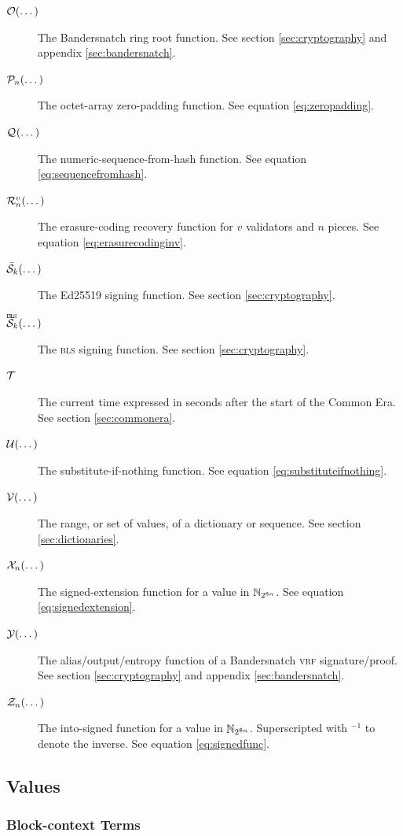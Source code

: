 \begin{description}
  \item[$\getringroot{\dots}$] The Bandersnatch ring root function. See section \ref{sec:cryptography} and appendix \ref{sec:bandersnatch}.
  \item[$\zeropad{n}{\dots}$] The octet-array zero-padding function. See equation \ref{eq:zeropadding}.
  \item[$\seqfromhash{}{\dots}$] The numeric-sequence-from-hash function. See equation \ref{eq:sequencefromhash}.
  \item[$\ecrecover{v}{n}{\dots}$] The erasure-coding recovery function for $v$ validators and $n$ pieces. See equation \ref{eq:erasurecodinginv}.
  \item[$\edsigndata{k}{\dots}$] The Ed25519 signing function. See section \ref{sec:cryptography}.
  \item[$\blssigndata{k}{\dots}$] The \textsc{bls} signing function. See section \ref{sec:cryptography}.
  \item[$\mathcal{T}$] The current time expressed in seconds after the start of the \Jam Common Era. See section \ref{sec:commonera}.
  \item[$\subifnone{\dots}$] The substitute-if-nothing function. See equation \ref{eq:substituteifnothing}.
  \item[$\values{\dots}$] The range, or set of values, of a dictionary or sequence. See section \ref{sec:dictionaries}.
  \item[$\sext{n}{\dots}$] The signed-extension function for a value in $\mathbb{N}_{2^{8n}}$. See equation \ref{eq:signedextension}.
  \item[$\banderout{\dots}$] The alias/output/entropy function of a Bandersnatch \textsc{vrf} signature/proof. See section \ref{sec:cryptography} and appendix \ref{sec:bandersnatch}.
  \item[$\mathcal{Z}_{n}(\dots)$] The into-signed function for a value in $\mathbb{N}_{2^{8n}}$. Superscripted with ${}^{-1}$ to denote the inverse. See equation \ref{eq:signedfunc}.
\end{description}

\subsection{Values}

\subsubsection{Block-context Terms}


